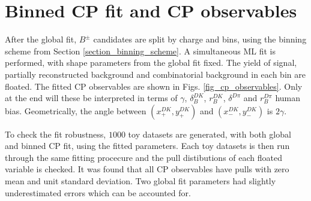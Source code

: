\documentclass[12pt, a4paper, notitlepage, onecolumn]{article}
\begin{document}
\section{Binned CP fit and CP observables}
\noindent After the global fit, $B^\pm$ candidates are split by charge and bins, using the binning scheme from Section \ref{section_binning_scheme}. A simultaneous ML fit is performed, with shape parameters from the global fit fixed. The yield of signal, partially reconstructed background and combinatorial background in each bin are floated. The fitted CP observables are shown in Figs. \ref{fig_cp_observables}. Only at the end will these be interpreted in terms of $\gamma$, $\delta_B^{DK}$, $r_B^{DK}$, $\delta^{D\pi}$ and $r_B^{D\pi}$ human bias. Geometrically, the angle between $(x_+^{DK}, y_+^{DK})$ and $(x_-^{DK}, y_-^{DK})$ is $2\gamma$.

To check the fit robustness, $1000$ toy datasets are generated, with both global and binned CP fit, using the fitted parameters. Each toy datasets is then run through the same fitting procecure and the pull distibutions of each floated variable is checked. It was found that all CP observables have pulls with zero mean and unit standard deviation. Two global fit parameters had slightly underestimated errors which can be accounted for.
\end{document}
